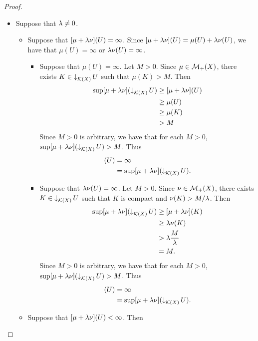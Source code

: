 \documentclass{book}
\begin{document}
\begin{proof}
\begin{enumerate}
\begin{itemize}
\begin{align*}
					& = \mu(U) \\
					& = [\mu + \lam \nu](U).
				\end{align*}
				\item Suppose that $\lambda \neq 0$. 
				\begin{itemize}
					\item Suppose that $[\mu + \lambda \nu](U) = \infty$. Since $[\mu + \lambda \nu](U) = \mu(U) + \lambda \nu(U)$, we have that $\mu(U) = \infty$ or $\lambda \nu(U) = \infty$. 
					\begin{itemize}
						\item Suppose that $\mu(U) = \infty$. Let $M > 0$. Since $\mu \in \mathcal{M}_+(X)$, there exists $K \in \operatorname{\downarrow}_{\mathcal{K}(X)} U$ such that $\mu(K) > M$. Then 
						\begin{align*}
							\sup [\mu + \lambda \nu] (\operatorname{\downarrow}_{\mathcal{K}(X)} U) 
							& \geq [\mu + \lambda \nu](U) \\
							& \geq \mu(U) \\
							& \geq \mu(K) \\
							& > M
						\end{align*}
						Since $M > 0$ is arbitrary, we have that for each $M >0$, $\sup [\mu + \lambda \nu] (\operatorname{\downarrow}_{\mathcal{K}(X)} U) > M$. Thus 
						\begin{align*}
							[\mu + \lam \nu](U)
							& = \infty \\
							& = \sup [\mu + \lam \nu] (\doar_{\MK(X)} U).
						\end{align*}
						\item Suppose that $\lambda \nu(U) = \infty$. 
						Let $M > 0$. Since $\nu \in \mathcal{M}_+(X)$, there exists $K \in \operatorname{\downarrow}_{\mathcal{K}(X)} U$ such that $K$ is compact and $\nu(K) > M/\lambda$. Then 
						\begin{align*}
							\sup [\mu + \lambda \nu] (\operatorname{\downarrow}_{\mathcal{K}(X)} U)
							& \geq [\mu + \lambda \nu](K) \\
							& \geq \lambda \nu(K) \\
							& > \lambda \frac{M}{\lambda} \\
							& = M.
						\end{align*} 
						Since $M > 0$ is arbitrary, we have that for each $M >0$, $\sup [\mu + \lambda \nu] (\operatorname{\downarrow}_{\mathcal{K}(X)} U) > M$. Thus 
						\begin{align*}
							[\mu + \lam \nu](U)
							& = \infty \\
							& = \sup [\mu + \lam \nu] (\doar_{\MK(X)} U).
						\end{align*}
					\end{itemize}
					\item Suppose that $[\mu + \lambda \nu](U) < \infty$. Then 

\end{itemize}
\end{itemize}
\end{enumerate}
\end{proof}
\end{document}
